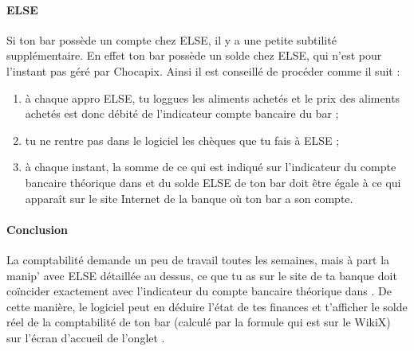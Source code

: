 \documentclass[12pt,french]{article}
\begin{document}
\paragraph{ELSE} Si ton bar possède un compte chez ELSE, il y a une petite subtilité supplémentaire. En effet ton bar possède un solde chez ELSE, qui n'est pour l'instant pas géré par Chocapix. Ainsi il est conseillé de procéder comme il suit :
\begin{enumerate}
	\item à chaque appro ELSE, tu loggues les aliments achetés et le prix des aliments achetés est donc débité de l'indicateur compte bancaire du bar ;
	\item tu ne rentre pas dans le logiciel les chèques que tu fais à ELSE ;
	\item à chaque instant, la somme de ce qui est indiqué sur l'indicateur du compte bancaire théorique dans  et du solde ELSE de ton bar doit être égale à ce qui apparaît sur le site Internet de la banque où ton bar a son compte.
\end{enumerate}

\paragraph{Conclusion} La comptabilité demande un peu de travail toutes les semaines, mais à part la manip' avec ELSE détaillée au dessus, ce que tu as sur le site de ta banque doit coïncider exactement avec l'indicateur du compte bancaire théorique dans . De cette manière, le logiciel peut en déduire l'état de tes finances et t'afficher le solde réel de la comptabilité de ton bar (calculé par la formule qui est sur le WikiX) sur l'écran d'accueil de l'onglet .
\end{document}

